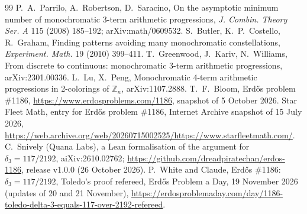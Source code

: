 \documentclass[11pt]{article}
\begin{document}
\begin{thebibliography}{99}
 P.~A.~Parrilo, A.~Robertson, D.~Saracino, On the asymptotic minimum number of monochromatic 3-term arithmetic progressions, \emph{J. Combin. Theory Ser. A} 115 (2008) 185--192; arXiv:math/0609532.
 S.~Butler, K.~P.~Costello, R.~Graham, Finding patterns avoiding many monochromatic constellations, \emph{Experiment. Math.} 19 (2010) 399--411.
 T.~Greenwood, J.~Kariv, N.~Williams, From discrete to continuous: monochromatic 3-term arithmetic progressions, arXiv:2301.00336.
 L.~Lu, X.~Peng, Monochromatic 4-term arithmetic progressions in 2-colorings of $\mathbb{Z}_n$, arXiv:1107.2888.
 T.~F.~Bloom, Erd\H{o}s problem \#1186, \url{https://www.erdosproblems.com/1186}, snapshot of 5 October 2026.
 Star Fleet Math, entry for Erd\H{o}s problem \#1186, Internet Archive snapshot of 15 July 2026, \url{https://web.archive.org/web/20260715002525/https://www.starfleetmath.com/}.
 C.~Snively (Quana Labs), a Lean formalisation of the argument for $\delta_3=117/2192$, aiXiv:2610.02762; \url{https://github.com/dreadpiratechan/erdos-1186}, release v1.0.0 (26 October 2026).
 P.~White and Claude, Erd\H{o}s \#1186: $\delta_3=117/2192$, Toledo's proof refereed, Erd\H{o}s Problem a Day, 19 November 2026 (updates of 20 and 21 November), \url{https://erdosproblemaday.com/day/1186-toledo-delta-3-equals-117-over-2192-refereed}.
\end{thebibliography}
\end{document}
